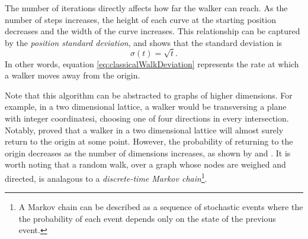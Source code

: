 \documentclass[../../dissertation.tex]{subfiles}
\begin{document}
The number of iterations directly affects how far the walker can reach. As the number of
steps increases, the height of each curve at the starting position decreases
and the width of the curve increases. This relationship can be captured by the
\textit{position standard deviation}, and \cite{REN1} shows that the standard
deviation is
\begin{equation}
	\sigma(t) = \sqrt{t}.
	\label{eq:classicalWalkDeviation}
\end{equation}
In other words, equation \ref{eq:classicalWalkDeviation} represents the rate at
which a walker moves away from the origin.\par
Note that this algorithm can be abstracted to graphs of higher dimensions. For
example, in a two dimensional lattice, a walker would be transversing a plane
with integer coordinatesi, choosing one of four directions in every
intersection. Notably, \cite{polya1921} proved that a walker in a two
dimensional lattice will almost surely return to the origin at some point.
However, the probability of returning to the origin decreases as the number of
dimensions increases, as shown by \cite{montrol1956} and \cite{finch2003}.
It is worth noting that a random walk, over a graph whose nodes are weighed and
directed, is analagous to a \textit{discrete-time Markov chain}\footnote{A
Markov chain can be described as a sequence of stochastic events where the the
probability of each event depends only on the state of the previous
event.}.
\end{document}
